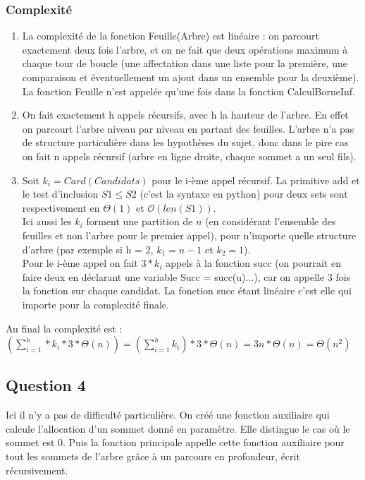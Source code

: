 \documentclass{article}
\begin{document}
\subsubsection{Complexité}
\begin{enumerate}
\item La complexité de la fonction Feuille(Arbre) est linéaire : on parcourt exactement deux fois l'arbre, et on ne fait que deux opérations maximum à chaque tour de boucle (une affectation dans une liste pour la première, une comparaison et éventuellement un ajout dans un ensemble pour la deuxième). La fonction Feuille n'est appelée qu'une fois dans la fonction CalculBorneInf.

\item On fait exactement h appels récursifs, avec h la hauteur de l'arbre. En effet on parcourt l'arbre niveau par niveau en partant des feuilles. L'arbre n'a pas de structure particulière dans les hypothèses du sujet, donc dans le pire cas on fait n appels récursif (arbre en ligne droite, chaque sommet a un seul fils).

\item Soit $k_i = Card(Candidats)$ pour le i-ème appel récursif. La primitive add et le test d'inclusion $S1 \leq S2$ (c'est la syntaxe en python) pour deux sets sont respectivement en $\Theta(1)$ et $\mathcal{O}(len(S1))$. \\
Ici aussi les $k_i$ forment une partition de $n$ (en considérant l'ensemble des feuilles et non l'arbre pour le premier appel), pour n'importe quelle structure d'arbre (par exemple si h = 2, $k_1 = n-1$ et $k_2 = 1$). \\
Pour le i-ème appel on fait $3*k_i$ appels à la fonction succ (on pourrait en faire deux en déclarant une variable Succ = succ(u)...), car on appelle 3 fois la fonction sur chaque candidat. La fonction succ étant linéaire c'est elle qui importe pour la complexité finale.
\end{enumerate}
Au final la complexité est : $(\sum\limits_{i=1}^h*k_i*3*\Theta(n)) = (\sum\limits_{i=1}^hk_i)*3*\Theta(n) = 3n*\Theta(n) = \Theta(n^2)$

\subsection{Question 4}
Ici il n'y a pas de difficulté particulière. On créé une fonction auxiliaire qui calcule l'allocation d'un sommet donné en paramètre. Elle distingue le cas où le sommet est 0. 
Puis la fonction principale appelle cette fonction auxiliaire pour tout les sommets de l'arbre grâce à un parcours en profondeur, écrit récursivement.
\end{document}
